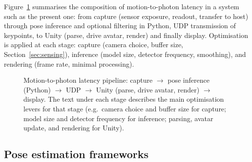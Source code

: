 Figure~\ref{fig:latency-pipeline} summarises the composition of motion-to-photon latency in a system such as the present one: from capture (sensor exposure, readout, transfer to host) through pose inference and optional filtering in Python, UDP transmission of keypoints, to Unity (parse, drive avatar, render) and finally display. Optimisation is applied at each stage: capture (camera choice, buffer size, Section~\ref{sec:sensing}), inference (model size, detector frequency, smoothing), and rendering (frame rate, minimal processing).

\begin{figure}[htbp]
  \centering
  \caption{Motion-to-photon latency pipeline: capture $\rightarrow$ pose inference (Python) $\rightarrow$ UDP $\rightarrow$ Unity (parse, drive avatar, render) $\rightarrow$ display. The text under each stage describes the main optimisation levers for that stage (e.g.\ camera choice and buffer size for capture; model size and detector frequency for inference; parsing, avatar update, and rendering for Unity).}
  \label{fig:latency-pipeline}
\end{figure}

\subsection{Pose estimation frameworks}

